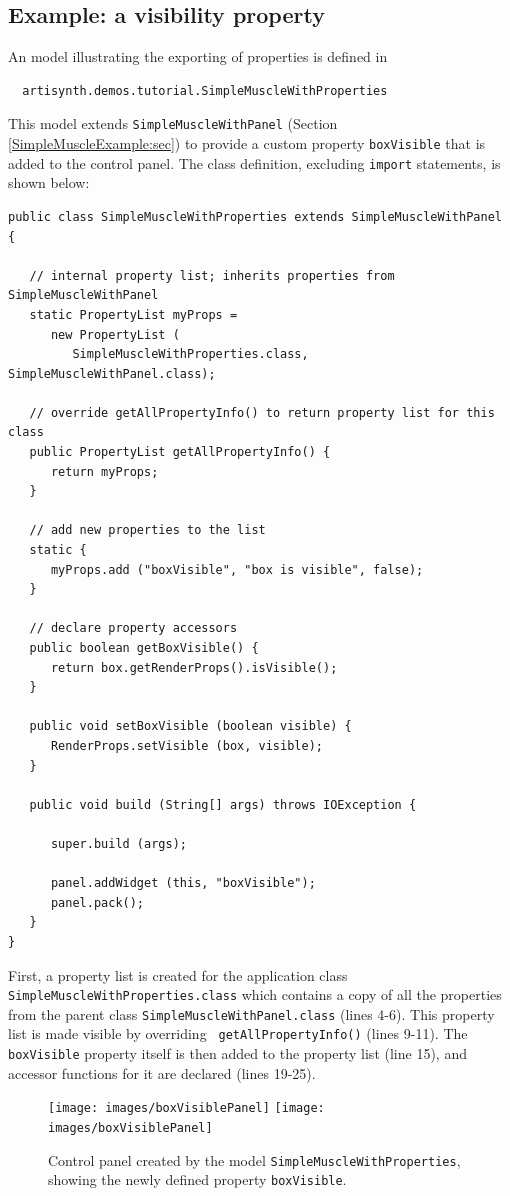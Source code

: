 \subsection{Example: a visibility property}
%
An model illustrating the exporting of properties is defined in
%
\begin{verbatim}
  artisynth.demos.tutorial.SimpleMuscleWithProperties
\end{verbatim}
%
This model extends {\tt SimpleMuscleWithPanel} (Section
\ref{SimpleMuscleExample:sec}) to provide a custom property
{\tt boxVisible} that is added to the control panel.
The class definition, excluding {\tt import} statements,
is shown below:
%
\lstset{numbers=left}
\begin{lstlisting}[]
public class SimpleMuscleWithProperties extends SimpleMuscleWithPanel {

   // internal property list; inherits properties from SimpleMuscleWithPanel
   static PropertyList myProps =
      new PropertyList (
         SimpleMuscleWithProperties.class, SimpleMuscleWithPanel.class);

   // override getAllPropertyInfo() to return property list for this class
   public PropertyList getAllPropertyInfo() {
      return myProps;
   }

   // add new properties to the list
   static {
      myProps.add ("boxVisible", "box is visible", false);
   }

   // declare property accessors
   public boolean getBoxVisible() {
      return box.getRenderProps().isVisible();
   }

   public void setBoxVisible (boolean visible) {
      RenderProps.setVisible (box, visible);
   }

   public void build (String[] args) throws IOException {

      super.build (args);

      panel.addWidget (this, "boxVisible");
      panel.pack();
   }
}
\end{lstlisting}
\lstset{numbers=none}
%
First, a property list is created for the application class {\tt
SimpleMuscleWithProperties.class} which contains a copy of all the
properties from the parent class {\tt SimpleMuscleWithPanel.class}
(lines 4-6). This property list is made visible by overriding {\tt
getAllPropertyInfo()} (lines 9-11). The {\tt boxVisible} property
itself is then added to the property list (line 15), and accessor
functions for it are declared (lines 19-25).

\begin{figure}[t]
\begin{center}
\iflatexml
 \texttt{[image: images/boxVisiblePanel]}
\else
 \texttt{[image: images/boxVisiblePanel]}
\fi
\end{center}
\caption{Control panel created by the model {\tt SimpleMuscleWithProperties},
showing the newly defined property {\tt boxVisible}.}
\label{boxVisiblePanel:fig}
\end{figure}

